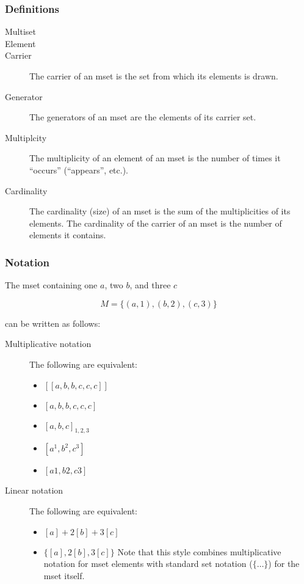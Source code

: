 \documentclass[reqno,12pt]{article}
\numberwithin{equation}{subsection}
\begin{document}
\subsubsection{Definitions}

\begin{description}
\item [Multiset]
\item [Element]
\item [Carrier]  The carrier of an mset is the set from which its elements is drawn.
\item [Generator]  The generators of an mset are the elements of its carrier set.
\item [Multiplcity]  The multiplicity of an element of an mset is the number of times it ``occurs'' (``appears'', etc.).
\item [Cardinality] The cardinality (size) of an mset is the sum of
  the multiplicities of its elements.  The cardinality of the carrier of an mset is the number of elements it contains.
\end{description}

\subsubsection{Notation}

The mset containing one $a$, two $b$, and three $c$

\begin{equation}
  M = \{(a,1), (b,2), (c, 3)\}
\end{equation}

\noindent can be written as follows:

\begin{description}
\item [Multiplicative notation]  The following are equivalent:

\begin{itemize}
\item $[[a,b,b,c,c,c]]$
\item $[a,b,b,c,c,c]$
\item $[a,b,c]_{1,2,3}$
\item $[a^1,b^2,c^3]$
\item $[a1,b2,c3]$
\end{itemize}

\item [Linear notation]  The following are equivalent:

\begin{itemize}
\item $[a]+2[b]+3[c]$
\item $\{[a],2[b],3[c]\}$ Note that this style combines multiplicative
  notation for mset elements with standard set notation ($\{\ldots\}$)
  for the mset itself.
\end{itemize}
\end{description}
\end{document}

